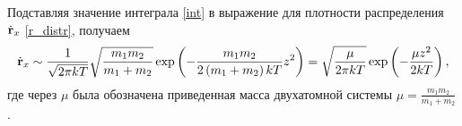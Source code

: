 Подставляя значение интеграла \eqref{int} в выражение для плотности распределения $\dot{\mathbf{r}}_x$ \eqref{r_distr}, получаем
\begin{gather}
		\dot{\mathbf{r}}_x \sim \frac{1}{\sqrt{2 \pi k T}} \sqrt{ \frac{m_1 m_2}{m_1 + m_2} } \exp \left( - \frac{m_1 m_2}{2 \left( m_1 + m_2 \right) k T} z^2 \right) = \sqrt{ \frac{\mu}{2 \pi k T} } \exp \left( - \frac{\mu z^2}{2 k T} \right) \notag, 
\end{gather}
где через $\mu$ была обозначена приведенная масса двухатомной системы $ \mu = \displaystyle \frac{m_1 m_2}{m_1 + m_2} $.


